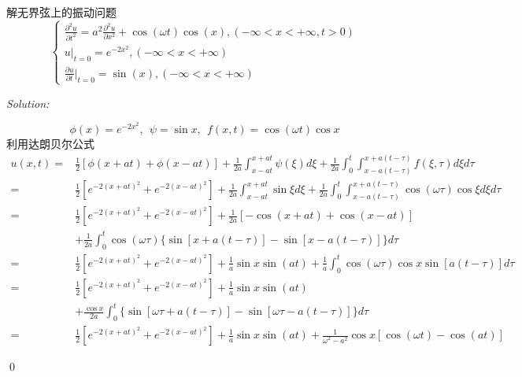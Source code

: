 \documentclass[12pt]{article}
\newenvironment{problem}[2][Problem]{\begin{trivlist}
\item[\hskip \labelsep {\bfseries #1}\hskip \labelsep {\bfseries #2.}]}{\end{trivlist}}
\newenvironment{sol}
    {\emph{Solution:}
    }
    {
    \qed
    }
\begin{document}
\begin{problem}{1}
解无界弦上的振动问题
\[
\left\{\begin{array}{l}
\frac{\partial^2u}{\partial t^2}=a^2\frac{\partial^2u}{\partial x^2}+\cos(\omega t)\cos(x),(-\infty<x<+\infty,t>0)\\
u|_{t=0}=e^{-2x^2},(-\infty<x<+\infty)\\
\frac{\partial u}{\partial t}|_{t=0}=\sin(x),(-\infty<x<+\infty)
\end{array}\right.
\]
\end{problem}
\begin{sol}
\[
\phi(x)=e^{-2x^2},~~\psi=\sin x,~~f(x,t)=\cos(\omega t)\cos x
\]
利用达朗贝尔公式
\begin{align*}
u(x,t)=&\frac{1}{2}[\phi(x+at)+\phi(x-at)]+\frac{1}{2a}\int_{x-at}^{x+at}\psi(\xi)d\xi+\frac{1}{2a}\int_0^t\int_{x-a(t-\tau)}^{x+a(t-\tau)}f(\xi,\tau)d\xi d\tau\\
=&\frac{1}{2}[e^{-2(x+at)^2}+e^{-2(x-at)^2}]+\frac{1}{2a}\int_{x-at}^{x+at}\sin\xi d\xi+\frac{1}{2a}\int_0^t\int_{x-a(t-\tau)}^{x+a(t-\tau)}\cos(\omega\tau)\cos\xi d\xi d\tau\\
=&\frac{1}{2}[e^{-2(x+at)^2}+e^{-2(x-at)^2}]+\frac{1}{2a}[-\cos(x+at)+\cos(x-at)]\\
&+\frac{1}{2a}\int_0^t\cos(\omega\tau)\{\sin[x+a(t-\tau)]-\sin[x-a(t-\tau)]\}d\tau\\
=&\frac{1}{2}[e^{-2(x+at)^2}+e^{-2(x-at)^2}]+\frac{1}{a}\sin x\sin(at)+\frac{1}{a}\int_0^t\cos(\omega\tau)\cos x\sin[a(t-\tau)]d\tau\\
=&\frac{1}{2}[e^{-2(x+at)^2}+e^{-2(x-at)^2}]+\frac{1}{a}\sin x\sin(at)\\
&+\frac{\cos x}{2a}\int_0^t\{\sin[\omega\tau+a(t-\tau)]-\sin[\omega\tau-a(t-\tau)]\}d\tau\\
=&\frac{1}{2}[e^{-2(x+at)^2}+e^{-2(x-at)^2}]+\frac{1}{a}\sin x\sin(at)+\frac{1}{\omega^2-a^2}\cos x[\cos(\omega t)-\cos(at)]
\end{align*}
\end{sol}
\end{document}
